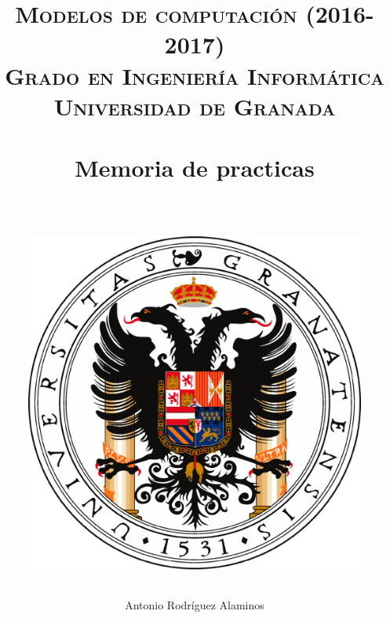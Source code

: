 


\title{	
\normalfont \normalsize 
\textsc{\textbf{Modelos de computación (2016-2017)} \\ Grado en Ingeniería Informática \\ Universidad de Granada} \\ [25pt] %
\horrule{0.5pt} \\[0.4cm] %
\huge Memoria de practicas \\ %
\horrule{2pt} \\[0.5cm] %
\begin{figure}[H] %
	\centering
	\includegraphics[scale=0.5]{image/ugr.png}  %
\end{figure}
}

\author{Antonio Rodríguez Alaminos} %

